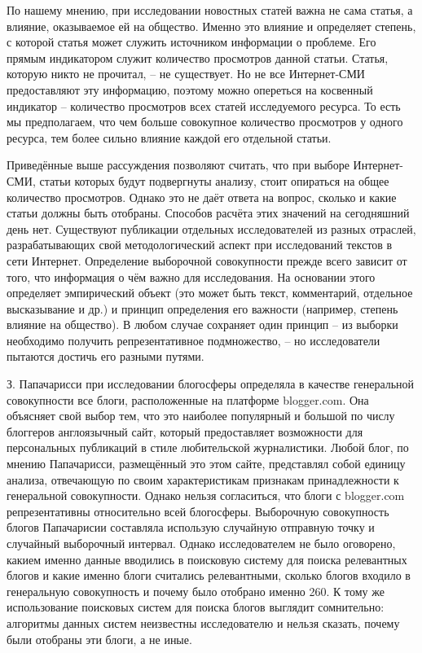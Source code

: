 По нашему мнению, при исследовании новостных статей важна не сама статья, а влияние, оказываемое ей на общество. Именно это влияние и определяет степень, с которой статья может служить источником информации о проблеме. Его прямым индикатором служит количество просмотров данной статьи. Статья, которую никто не прочитал, -- не существует. Но не все Интернет-СМИ предоставляют эту информацию, поэтому можно опереться на косвенный индикатор -- количество просмотров всех статей исследуемого ресурса. То есть мы предполагаем, что чем больше совокупное количество просмотров у одного ресурса, тем более сильно влияние каждой его отдельной статьи.

Приведённые выше рассуждения позволяют считать, что при выборе Интернет-СМИ, статьи которых будут подвергнуты анализу, стоит опираться на общее количество просмотров. Однако это не даёт ответа на вопрос, сколько и какие статьи должны быть отобраны. Способов расчёта этих значений на сегодняшний день нет. Существуют публикации отдельных исследователей из разных отраслей, разрабатывающих свой методологический аспект при исследований текстов в сети Интернет. Определение выборочной совокупности прежде всего зависит от того, что информация о чём важно для исследования. На основании этого определяет эмпирический объект (это может быть текст, комментарий, отдельное высказывание и др.) и принцип определения его важности (например, степень влияние на общество). В любом случае сохраняет один принцип -- из выборки необходимо получить репрезентативное подмножество, -- но исследователи пытаются достичь его разными путями.

З. Папачарисси при исследовании блогосферы определяла в качестве генеральной совокупности все блоги, расположенные на платформе blogger.com. Она объясняет свой выбор тем, что это наиболее популярный и большой по числу блоггеров англоязычный сайт, который предоставляет возможности для персональных публикаций в стиле любительской журналистики. Любой блог, по мнению Папачарисси, размещённый это этом сайте, представлял собой единицу анализа, отвечающую по своим характеристикам признакам принадлежности к генеральной совокупности. Однако нельзя согласиться, что блоги с blogger.com репрезентативны относительно всей блогосферы. Выборочную совокупность блогов Папачарисии составляла использую случайную отправную точку и случайный выборочный интервал. Однако исследователем не было оговорено, какием именно данные вводились в поисковую систему для поиска релевантных блогов и какие именно блоги считались релевантными, сколько блогов входило в генеральную совокупность и почему было отобрано именно 260. К тому же использование поисковых систем для поиска блогов выглядит сомнительно: алгоритмы данных систем неизвестны исследователю и нельзя сказать, почему были отобраны эти блоги, а не иные.

